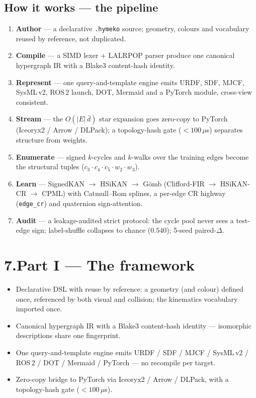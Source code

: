 \documentclass[10pt]{article}
\begin{document}
\subsection*{How it works --- the pipeline}
\begin{enumerate}
\item \textbf{Author} --- a declarative \texttt{.hymeko} source; geometry, colours and vocabulary reused by reference, not duplicated.
\item \textbf{Compile} --- a SIMD lexer + LALRPOP parser produce one canonical hypergraph IR with a Blake3 content-hash identity.
\item \textbf{Represent} --- one query-and-template engine emits URDF, SDF, MJCF, SysML\,v2, ROS\,2 launch, DOT, Mermaid and a PyTorch module, cross-view consistent.
\item \textbf{Stream} --- the $O(|E|\,\bar d)$ star expansion goes zero-copy to PyTorch (Iceoryx2 / Arrow / DLPack); a topology-hash gate ($<100\,\mu$s) separates structure from weights.
\item \textbf{Enumerate} --- signed $k$-cycles and $k$-walks over the training edges become the structural tuples ($c_3\cdot c_4\cdot c_5\cdot w_2\cdot w_3$).
\item \textbf{Learn} --- SignedKAN $\to$ HSiKAN $\to$ G\"omb (Clifford-FIR $\to$ HSiKAN-CR $\to$ CPML) with Catmull--Rom splines, a per-edge CR highway (\texttt{edge\_cr}) and quaternion sign-attention.
\item \textbf{Audit} --- a leakage-audited strict protocol: the cycle pool never sees a test-edge sign; label-shuffle collapses to chance ($0.540$); 5-seed paired-$\Delta$.
\end{enumerate}

\section*{\color{accent}7.\quad Part I --- The framework}
\begin{itemize}
\item Declarative DSL with reuse by reference: a geometry (and colour) defined once, referenced by both visual and collision; the kinematics vocabulary imported once.
\item Canonical hypergraph IR with a Blake3 content-hash identity --- isomorphic descriptions share one fingerprint.
\item One query-and-template engine emits URDF / SDF / MJCF / SysML\,v2 / ROS\,2 / DOT / Mermaid / PyTorch --- no recompile per target.
\item Zero-copy bridge to PyTorch via Iceoryx2 / Arrow / DLPack, with a topology-hash gate ($<100\,\mu$s).
\end{itemize}
\end{document}
